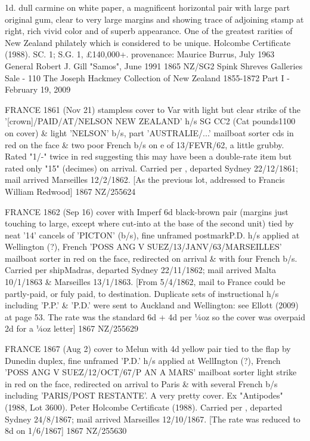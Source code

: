 \documentclass[justified]{tufte-book}
\begin{document}
%
{1d. dull carmine on white paper, a magnificent horizontal pair with large part original gum, clear to very large margins and showing trace of adjoining stamp at right, rich vivid color and of superb appearance. One of the greatest rarities of New Zealand philately which is considered to be unique. Holcombe Certificate (1988). SC. 1; S.G. 1, \pounds{140,000}+. provenance: Maurice Burrus, July 1963 General Robert J. Gill "Samos", June 1991}%
{1865}%
{NZ/SG2}%
{Spink Shreves Galleries Sale - 110
The Joseph Hackmey Collection of New Zealand 1855-1872 Part I - February 19, 2009}%
{}
{}%
{}%


%
{FRANCE 1861 (Nov 21) stampless cover to Var with light but clear strike of the '[crown]/PAID/AT/NELSON NEW ZEALAND' h/s SG CC2 (Cat pounds{1100} on cover) \& light 'NELSON' b/s, part 'AUSTRALIE/...' mailboat sorter cds in red on the face \& two poor French b/s on e of 13/FEVR/62, a little grubby. Rated "1/-" twice in red suggesting this may have been a double-rate item but rated only "15" (decimes) on arrival. Carried per , departed Sydney 22/12/1861; mail arrived Marseilles 12/2/1862. [As the previous lot, addressed to Francis William Redwood]}%
{1867}%
{NZ/255624}%
{}%
{}
{}%
{}


%
{ FRANCE 1862 (Sep 16) cover with Imperf 6d black-brown pair (margins just touching to large, except where cut-into at the base of the second unit) tied by neat '14' cancels of 'PICTON' (b/s), fine unframed postmark{P.D.} h/s applied at Wellington (?), French 'POSS ANG V SUEZ/13/JANV/63/MARSEILLES' mailboat sorter in red on the face, redirected on arrival \& with four French b/s. Carried per ship{Madras}, departed Sydney 22/11/1862; mail arrived Malta 10/1/1863 \& Marseilles 13/1/1863. [From 5/4/1862, mail to France could be partly-paid, or fuly paid, to destination. Duplicate sets of instructional h/s including 'P.P.' \& 'P.D.' were sent to Auckland and Wellington: see Ellott (2009) at page 53. The rate was the standard 6d + 4d per ¼oz so the cover was overpaid 2d for a ¼oz letter]}%
{1867}%
{NZ/255629}%
{}%
{}
{}%
{}


%
{FRANCE 1867 (Aug 2) cover to Melun with 4d yellow pair tied to the flap by Dunedin duplex, fine unframed 'P.D.' h/s applied at WellIngton (?), French 'POSS ANG V SUEZ/12/OCT/67/P AN A MARS' mailboat sorter light strike in red on the face, redirected on arrival to Paris \& with several French b/s including 'PARIS/POST RESTANTE'. A very pretty cover. Ex "Antipodes" (1988, Lot 3600). Peter Holcombe Certificate (1988). Carried per , departed Sydney 24/8/1867; mail arrived Marseilles 12/10/1867. [The rate was reduced to 8d on 1/6/1867]}%
{1867}%
{NZ/255630}%
{}%
{}
{}%
{}
\end{document}
